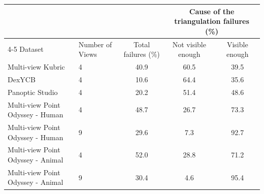 \begin{tabular}{llccc}
\toprule
 & & & \multicolumn{2}{c}{Cause of the triangulation failures (\%)} \\
\cmidrule(lr){4-5}
Dataset & Number of Views & Total failures (\%) & Not visible enough & Visible enough \\
\midrule
\rowcolor{rowgray}
Multi-view Kubric & 4 & 40.9 & 60.5 & 39.5 \\
DexYCB & 4 & 10.6 & 64.4 & 35.6 \\
\rowcolor{rowgray}
Panoptic Studio & 4 & 20.2 & 51.4 & 48.6 \\
\midrule
\rowcolor{rowgray}
Multi-view Point Odyssey - Human & 4 & 48.7 & 26.7 & 73.3 \\
Multi-view Point Odyssey - Human & 9 & 29.6 & 7.3 & 92.7 \\
\rowcolor{rowgray}
Multi-view Point Odyssey - Animal & 4 & 52.0 & 28.8 & 71.2 \\
Multi-view Point Odyssey - Animal & 9 & 30.4 & 4.6 & 95.4 \\
\bottomrule
\end{tabular}
